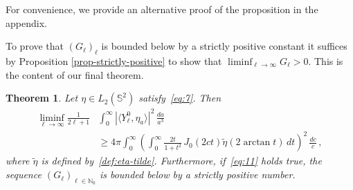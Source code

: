 \documentclass[a4paper,11pt,DIV=11,%
abstract=on%
]{scrartcl}
\newtheorem{thm}{Theorem}[section]
\def\N{{\mathbb N}}
\newcommand{\red}[1]{#1}
\begin{document}
For convenience, we provide an alternative proof of the proposition in the appendix.

To prove that $(G_\ell)_\ell$ 
is bounded below by a strictly positive constant 
it suffices by Proposition \ref{prop-strictly-positive} to show that $\liminf_{\ell\to\infty}G_\ell>0$.
This is the content of our final theorem.

\begin{thm}\label{thm:lower}
	Let $\eta\in L_2(\mathbb S^2)$ \red{satisfy~\eqref{eq:7}.}
	Then 
	\begin{align}
		\liminf_{\ell\to\infty}\frac{1}{2\ell+1}
		&\int_0^\infty |\langle Y_\ell^0, \eta_a \rangle|^2 \, \frac{da}{a^3}\nonumber\\
		&\geq 4\pi\int_0^\infty
		\left( \int_0^\infty \frac{2t}{1+t^2}\, J_0(2ct) \widetilde\eta(2\arctan t)\, dt \right)^2
		\, \frac{dc}{c}\,,\label{eq:31}
	\end{align}
\red{where $\widetilde\eta$ is defined by~\eqref{def:eta-tilde}.       
Furthermore, if~\eqref{eq:11} holds true,}  the sequence $(G_\ell)_{\ell\in\N_0}$
	is bounded below by a strictly positive number.
\end{thm}
\end{document}

